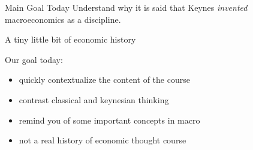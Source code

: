 \begin{frame}
\begin{block}{Main Goal Today}
\protect\hypertarget{main-goal-today}{}
Understand why it is said that Keynes \emph{invented} macroeconomics as
a discipline.
\end{block}
\end{frame}

\begin{frame}{A tiny little bit of economic history}
\protect\hypertarget{a-tiny-little-bit-of-economic-history}{}


Our goal today:

\begin{itemize}
\tightlist
\item
  quickly contextualize the content of the course
\item
  contrast classical and keynesian thinking
\item
  remind you of some important concepts in macro
\item
  not a real history of economic thought course
\end{itemize}
\end{frame}

